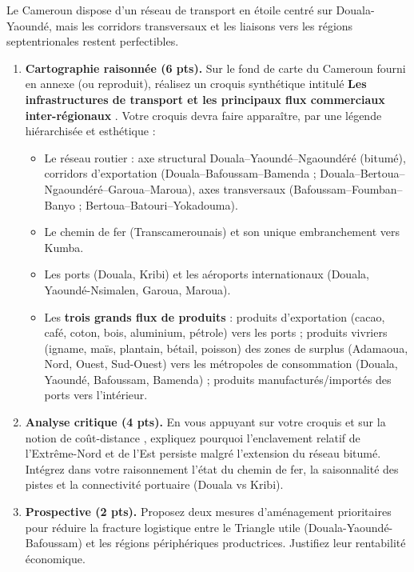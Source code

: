 \documentclass[11pt]{article}
\begin{document}
\begin{exercice}
Le Cameroun dispose d'un réseau de transport en étoile centré sur Douala-Yaoundé, mais les corridors transversaux et les liaisons vers les régions septentrionales restent perfectibles.

\begin{enumerate}
    \item \textbf{Cartographie raisonnée (6 pts).} Sur le fond de carte du Cameroun fourni en annexe (ou reproduit), réalisez un croquis synthétique intitulé \og \textbf{Les infrastructures de transport et les principaux flux commerciaux inter-régionaux} \fg. Votre croquis devra faire apparaître, par une légende hiérarchisée et esthétique :
    \begin{itemize}
        \item Le réseau routier : axe structural Douala--Yaoundé--Ngaoundéré (bitumé), corridors d'exportation (Douala--Bafoussam--Bamenda ; Douala--Bertoua--Ngaoundéré--Garoua--Maroua), axes transversaux (Bafoussam--Foumban--Banyo ; Bertoua--Batouri--Yokadouma).
        \item Le chemin de fer (Transcamerounais) et son unique embranchement vers Kumba.
        \item Les ports (Douala, Kribi) et les aéroports internationaux (Douala, Yaoundé-Nsimalen, Garoua, Maroua).
        \item Les \textbf{trois grands flux de produits} : produits d'exportation (cacao, café, coton, bois, aluminium, pétrole) vers les ports ; produits vivriers (igname, maïs, plantain, bétail, poisson) des zones de surplus (Adamaoua, Nord, Ouest, Sud-Ouest) vers les métropoles de consommation (Douala, Yaoundé, Bafoussam, Bamenda) ; produits manufacturés/importés des ports vers l'intérieur.
    \end{itemize}
    \item \textbf{Analyse critique (4 pts).} En vous appuyant sur votre croquis et sur la notion de \og coût-distance \fg, expliquez pourquoi l'enclavement relatif de l'Extrême-Nord et de l'Est persiste malgré l'extension du réseau bitumé. Intégrez dans votre raisonnement l'état du chemin de fer, la saisonnalité des pistes et la connectivité portuaire (Douala vs Kribi).
    \item \textbf{Prospective (2 pts).} Proposez deux mesures d'aménagement prioritaires pour réduire la fracture logistique entre le \og Triangle utile \fg (Douala-Yaoundé-Bafoussam) et les régions périphériques productrices. Justifiez leur rentabilité économique.
\end{enumerate}
\end{exercice}
\end{document}
